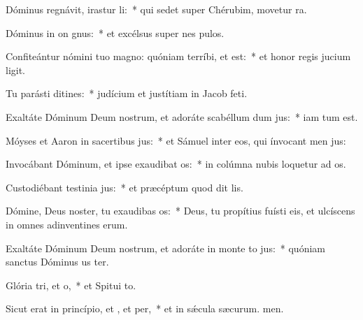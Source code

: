 \item Dóminus regnávit, irastur li:~* qui sedet super Chérubim, movetur ra.
\item Dóminus in on gnus:~* et excélsus super nes pulos.
\item Confiteántur nómini tuo magno: quóniam terríbi, et  est:~* et honor regis jucium ligit.
\item Tu parásti ditines:~* judícium et justítiam in Jacob  feti.
\item Exaltáte Dóminum Deum nostrum, et adoráte scabéllum dum jus:~* iam tum est.
\item Móyses et Aaron in sacertibus jus:~* et Sámuel inter eos, qui ínvocant men jus:
\item Invocábant Dóminum, et ipse exaudibat os:~* in colúmna nubis loquetur ad os.
\item Custodiébant testinia jus:~* et præcéptum quod dit lis.
\item Dómine, Deus noster, tu exaudibas os:~* Deus, tu propítius fuísti eis, et ulcíscens in omnes adinventines erum.
\item Exaltáte Dóminum Deum nostrum, et adoráte in monte to jus:~* quóniam sanctus Dóminus us ter.
\item Glória tri, et o,~* et Spitui to.
\item Sicut erat in princípio, et , et per,~* et in sǽcula sæcurum. men.

